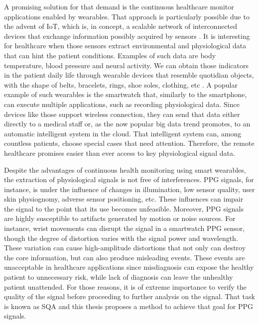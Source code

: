 A promising solution for that demand is the continuous healthcare monitor applications enabled by wearables. That approach is particularly possible due to the advent of \gls{IoT}, which is, in concept, a scalable network of interconnected devices that exchange information possibly acquired by sensors \cite{aouedi2024survey}. It is interesting for healthcare when those sensors extract environmental and physiological data that can hint the patient conditions. Examples of such data are body temperature, blood pressure and neural activity. We can obtain those indicators in the patient daily life through wearable devices that resemble quotidian objects, with the shape of belts, bracelets, rings, shoe soles, clothing, etc \cite{van2024smart}. A popular example of such wearables is the smartwatch that, similarly to the smartphone, can execute multiple applications, such as recording physiological data. Since devices like those support wireless connection, they can send that data either directly to a medical staff or, as the now popular big data trend promotes, to an automatic intelligent system in the cloud. That intelligent system can, among countless patients, choose special cases that need attention. Therefore, the remote healthcare promises easier than ever access to key physiological signal data. 

Despite the advantages of continuous health monitoring using smart wearables, the extraction of physiological signals is not free of interferences. \gls{PPG} signals, for instance, is under the influence of changes in illumination, low sensor quality, user skin physiognomy, adverse sensor positioning, etc. These influences can impair the signal to the point that its use becomes unfeasible. Moreover, \gls{PPG} signals are highly susceptible to artifacts generated by motion or noise sources. For instance, wrist movements can disrupt the signal in a smartwatch \gls{PPG} sensor, though the degree of distortion varies with the signal power and wavelength. These variation can cause high-amplitude distortions that not only can destroy the core information, but can also produce misleading events. These events are unacceptable in healthcare applications since misdiagnosis can expose the healthy patient to unnecessary risk, while lack of diagnosis can leave the unhealthy patient unattended. For those reasons, it is of extreme importance to verify the quality of the signal before proceeding to further analysis on the signal. That task is known as \gls{SQA} and this thesis proposes a method to achieve that goal for \gls{PPG} signals.


